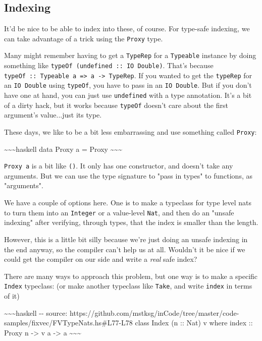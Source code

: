 \documentclass[]{article}
\begin{document}
\subsection{Indexing}

It'd be nice to be able to index into these, of course. For type-safe indexing,
we can take advantage of a trick using the \texttt{Proxy} type.

Many might remember having to get a \texttt{TypeRep} for a \texttt{Typeable}
instance by doing something like \texttt{typeOf\ (undefined\ ::\ IO\ Double)}.
That's because
\texttt{typeOf\ ::\ Typeable\ a\ =\textgreater{}\ a\ -\textgreater{}\ TypeRep}.
If you wanted to get the \texttt{typeRep} for an \texttt{IO\ Double} using
\texttt{typeOf}, you have to pass in an \texttt{IO\ Double}. But if you don't
have one at hand, you can just use \texttt{undefined} with a type annotation.
It's a bit of a dirty hack, but it works because \texttt{typeOf} doesn't care
about the first argument's value...just its type.

These days, we like to be a bit less embarrassing and use something called
\texttt{Proxy}:

\textasciitilde{}\textasciitilde{}\textasciitilde{}haskell data Proxy a = Proxy
\textasciitilde{}\textasciitilde{}\textasciitilde{}

\texttt{Proxy\ a} is a bit like \texttt{()}. It only has one constructor, and
doesn't take any arguments. But we can use the type signature to "pass in types"
to functions, as "arguments".

We have a couple of options here. One is to make a typeclass for type level nats
to turn them into an \texttt{Integer} or a value-level \texttt{Nat}, and then do
an "unsafe indexing" after verifying, through types, that the index is smaller
than the length.

However, this is a little bit silly because we're just doing an unsafe indexing
in the end anyway, so the compiler can't help us at all. Wouldn't it be nice if
we could get the compiler on our side and write a \emph{real} safe index?

There are many ways to approach this problem, but one way is to make a specific
\texttt{Index} typeclass: (or make another typeclass like \texttt{Take}, and
write \texttt{index} in terms of it)

\textasciitilde{}\textasciitilde{}\textasciitilde{}haskell -\/- source:
https://github.com/mstksg/inCode/tree/master/code-samples/fixvec/FVTypeNats.hs\#L77-L78
class Index (n :: Nat) v where index :: Proxy n -\textgreater{} v a
-\textgreater{} a \textasciitilde{}\textasciitilde{}\textasciitilde{}
\end{document}
